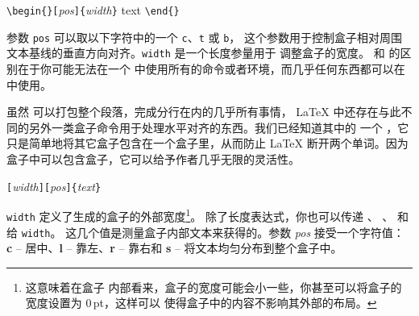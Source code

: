 \begin{lscommand}
\verb|\begin{|\verb|}[|\emph{pos}\verb|]{|\emph{width}\verb|}| text
\verb|\end{|\verb|}|
\end{lscommand}

参数 \texttt{pos} 可以取以下字符中的一个 \texttt{c}、\texttt{t}
 或 \texttt{b}，
这个参数用于控制盒子相对周围文本基线的垂直方向对齐。\texttt{width} 是一个长度参量用于
调整盒子的宽度。 和  的区别在于你可能无法在一个  中使用所有的命令或者环境，而几乎任何东西都可以在  中使用。

虽然 可以打包整个段落，完成分行在内的几乎所有事情，
\LaTeX{} 中还存在与此不同的另外一类盒子命令用于处理水平对齐的东西。我们已经知道其中的
一个 \pozhehao {}，它只是简单地将其它盒子包含在一个盒子里，从而防止
 \LaTeX{} 断开两个单词。因为盒子中可以包含盒子，它可以给予作者几乎无限的灵活性。

\begin{lscommand}
\verb|[|\emph{width}\verb|][|\emph{pos}\verb|]{|\emph{text}\verb|}|
\end{lscommand}

\noindent \texttt{width} 定义了生成的盒子的外部宽度\footnote{这意味着在盒子
内部看来，盒子的宽度可能会小一些，你甚至可以将盒子的宽度设置为 0\,pt，这样可以
使得盒子中的内容不影响其外部的布局。}。 除了长度表达式，你也可以传递
 、 、  和  给 \texttt{width}。
这几个值是测量盒子内部文本来获得的。参数 \emph{pos} 接受一个字符值：
\textbf{c} -- 居中、\textbf{l} -- 靠左、\textbf{r} -- 靠右和 \textbf{s} -- 
将文本均匀分布到整个盒子中。

